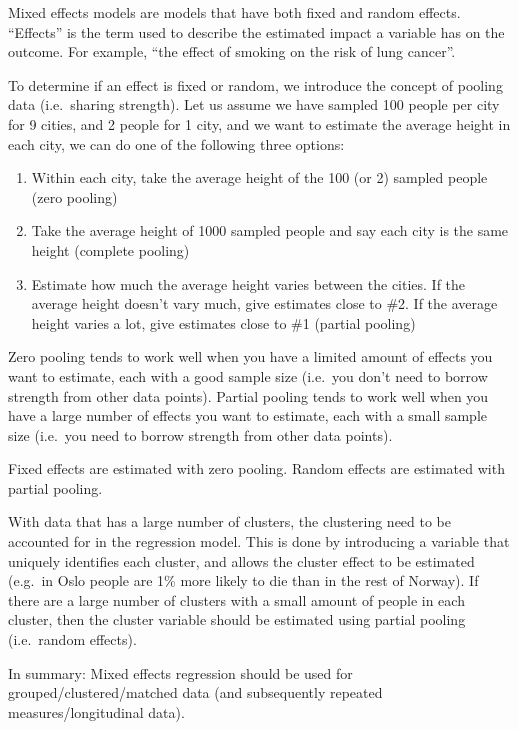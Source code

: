 \documentclass[12pt,]{article}
\providecommand{\tightlist}{%
  \setlength{\itemsep}{0pt}\setlength{\parskip}{0pt}}
\begin{document}
Mixed effects models are models that have both fixed and random effects.
``Effects'' is the term used to describe the estimated impact a variable
has on the outcome. For example, ``the effect of smoking on the risk of
lung cancer''.

To determine if an effect is fixed or random, we introduce the concept
of pooling data (i.e.~sharing strength). Let us assume we have sampled
100 people per city for 9 cities, and 2 people for 1 city, and we want
to estimate the average height in each city, we can do one of the
following three options:

\begin{enumerate}
\def\labelenumi{\arabic{enumi}.}
\tightlist
\item
  Within each city, take the average height of the 100 (or 2) sampled
  people (zero pooling)
\item
  Take the average height of 1000 sampled people and say each city is
  the same height (complete pooling)
\item
  Estimate how much the average height varies between the cities. If the
  average height doesn't vary much, give estimates close to \#2. If the
  average height varies a lot, give estimates close to \#1 (partial
  pooling)
\end{enumerate}

Zero pooling tends to work well when you have a limited amount of
effects you want to estimate, each with a good sample size (i.e.~you
don't need to borrow strength from other data points). Partial pooling
tends to work well when you have a large number of effects you want to
estimate, each with a small sample size (i.e.~you need to borrow
strength from other data points).

Fixed effects are estimated with zero pooling. Random effects are
estimated with partial pooling.

With data that has a large number of clusters, the clustering need to be
accounted for in the regression model. This is done by introducing a
variable that uniquely identifies each cluster, and allows the cluster
effect to be estimated (e.g.~in Oslo people are 1\% more likely to die
than in the rest of Norway). If there are a large number of clusters
with a small amount of people in each cluster, then the cluster variable
should be estimated using partial pooling (i.e.~random effects).

In summary: Mixed effects regression should be used for
grouped/clustered/matched data (and subsequently repeated
measures/longitudinal data).
\end{document}
